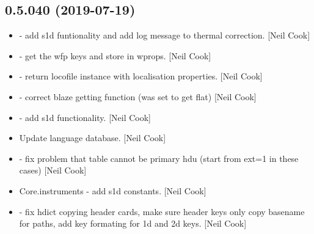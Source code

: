 \documentclass[a4paper,10pt,english]{report}
\begin{document}
\subsection{0.5.040 (2019-07-19)}
\label{\detokenize{misc/changelog:id101}}\begin{itemize}
\item {} 
 - add s1d funtionality and add log message
to thermal correction. {[}Neil Cook{]}

\item {} 
 - get the wfp keys and store in wprops. {[}Neil
Cook{]}

\item {} 
 - return locofile instance with
localisation properties. {[}Neil Cook{]}

\item {} 
 - correct blaze getting function (was set
to get flat) {[}Neil Cook{]}

\item {} 
 - add s1d functionality. {[}Neil Cook{]}

\item {} 
Update language database. {[}Neil Cook{]}

\item {} 
 - fix problem that table cannot be primary hdu (start from
ext=1 in these cases) {[}Neil Cook{]}

\item {} 
Core.instruments - add s1d constants. {[}Neil Cook{]}

\item {} 
 - fix hdict copying header cards, make sure header keys
only copy basename for paths, add key formating for 1d and 2d keys.
{[}Neil Cook{]}

\end{itemize}
\end{document}
